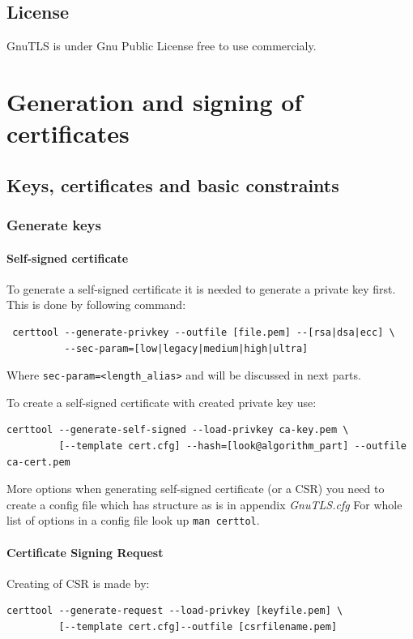 \documentclass[10pt, a4paper]{report}
\begin{document}
{  \subsection{License}
GnuTLS is under Gnu Public License \- free to use commercialy.
  
\section{Generation and signing of certificates}

  \subsection{Keys, certificates and basic constraints}
  
    \subsubsection{Generate keys}
    
      \paragraph{Self-signed certificate}
To generate a self-signed certificate it is needed to generate a private key first. This is done by following command:
\begin{verbatim}
 certtool --generate-privkey --outfile [file.pem] --[rsa|dsa|ecc] \
          --sec-param=[low|legacy|medium|high|ultra]
\end{verbatim}
Where \verb+sec-param=<length_alias>+ and will be discussed in next parts.

To create a self-signed certificate with created private key use:
\begin{verbatim}
certtool --generate-self-signed --load-privkey ca-key.pem \
         [--template cert.cfg] --hash=[look@algorithm_part] --outfile ca-cert.pem
\end{verbatim}

More options when generating self-signed certificate (or a CSR) you need to create a config file which has structure as is in appendix \textit{GnuTLS.cfg} 
For whole list of options in a config file look up \verb+man certtol+.
      
\paragraph{Certificate Signing Request}
Creating of CSR is made by:
\begin{verbatim}
certtool --generate-request --load-privkey [keyfile.pem] \
         [--template cert.cfg]--outfile [csrfilename.pem]
\end{verbatim}

}
\end{document}
